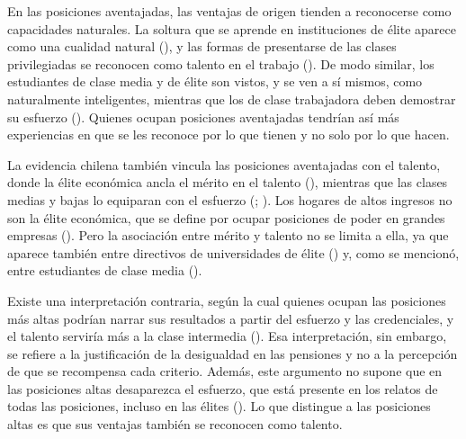 \documentclass[
  spanish,
  a4paper,
  oneside]{scrbook}
\begin{document}
En las posiciones aventajadas, las ventajas de origen tienden a
reconocerse como capacidades naturales. La soltura que se aprende en
instituciones de élite aparece como una cualidad natural
(), y las
formas de presentarse de las clases privilegiadas se reconocen como
talento en el trabajo (). De modo similar, los estudiantes de clase media y de
élite son vistos, y se ven a sí mismos, como naturalmente inteligentes,
mientras que los de clase trabajadora deben demostrar su esfuerzo
().
Quienes ocupan posiciones aventajadas tendrían así más experiencias en
que se les reconoce por lo que tienen y no solo por lo que hacen.

La evidencia chilena también vincula las posiciones aventajadas con el
talento, donde la élite económica ancla el mérito en el talento
(), mientras que las clases medias y bajas lo equiparan con el
esfuerzo (;
). Los hogares de altos ingresos no son la élite económica, que se
define por ocupar posiciones de poder en grandes empresas
(). Pero la asociación entre mérito y talento no se limita a ella,
ya que aparece también entre directivos de universidades de élite
() y, como se mencionó, entre estudiantes de clase media
().

Existe una interpretación contraria, según la cual quienes ocupan las
posiciones más altas podrían narrar sus resultados a partir del esfuerzo
y las credenciales, y el talento serviría más a la clase intermedia
(). Esa interpretación, sin embargo, se refiere a
la justificación de la desigualdad en las pensiones y no a la percepción
de que se recompensa cada criterio. Además, este argumento no supone que
en las posiciones altas desaparezca el esfuerzo, que está presente en
los relatos de todas las posiciones, incluso en las élites
(). Lo que
distingue a las posiciones altas es que sus ventajas también se
reconocen como talento.
\end{document}
